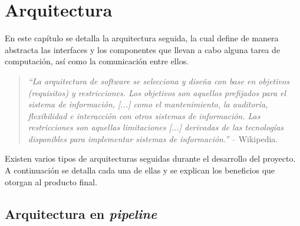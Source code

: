 

\chapter{Arquitectura} \label{cap:arch}

En este capítulo se detalla la arquitectura seguida, la cual define de manera abstracta las interfaces y los componentes que llevan a cabo alguna tarea de computación, así como la comunicación entre ellos.\n

\begin{quotation}
    \textit{``La arquitectura de software se selecciona y diseña con base en objetivos (requisitos) y restricciones. Los objetivos son aquellos prefijados para el sistema de información, [...] como el mantenimiento, la auditoría, flexibilidad e interacción con otros sistemas de información. Las restricciones son aquellas limitaciones [...] derivadas de las tecnologías disponibles para implementar sistemas de información.''} -- Wikipedia.\n
\end{quotation}

Existen varios tipos de arquitecturas seguidas durante el desarrollo del proyecto. A continuación se detalla cada una de ellas y se explican los beneficios que otorgan al producto final.\n


\section{Arquitectura en \textit{pipeline}} \label{sec:pipelinarch}


